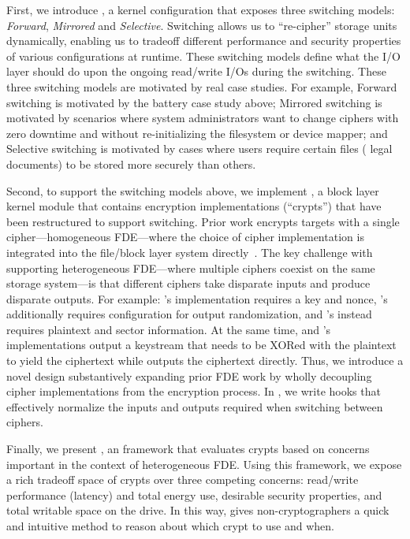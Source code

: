 First, we introduce \sysA, a kernel configuration that exposes three switching
models: {\em Forward}, {\em Mirrored} and {\em Selective}. Switching allows us
to ``re-cipher'' storage units dynamically, enabling us to tradeoff different
performance and security properties of various configurations at runtime. These
switching models define what the I/O layer should do upon the ongoing read/write
I/Os during the switching. These three switching models are motivated by real
case studies. For example, Forward switching is motivated by the battery case
study above; Mirrored switching is motivated by scenarios where system
administrators want to change ciphers with zero downtime and without
re-initializing the filesystem or device mapper; and
Selective switching is motivated by cases where users require certain files (\eg
legal documents) to be stored more securely than others.

Second, to support the switching models above, we implement \sysB, a block layer
kernel module that contains encryption implementations (``crypts'') that have
been restructured to support switching. Prior work encrypts targets with a
single cipher---\ie homogeneous FDE---where the choice of cipher implementation
is integrated into the file/block layer system directly~\cite{StrongBox,
dmcrypt}. The key challenge with supporting heterogeneous FDE---where multiple
ciphers coexist on the same storage system---is that different ciphers take
disparate inputs and produce disparate outputs. For example: \encB's
implementation requires a key and nonce, \encA's additionally requires
configuration for output randomization, and \encC's instead requires plaintext
and sector information. At the same time, \encA and \encB's implementations
output a keystream that needs to be XORed with the plaintext to yield the
ciphertext while \encC outputs the ciphertext directly. Thus, we introduce a
novel design substantively expanding prior FDE work by wholly decoupling cipher
implementations from the encryption process. In \sysB, we write hooks that
effectively normalize the inputs and outputs required when switching between
ciphers.

Finally, we present \sysC, an framework that evaluates crypts based on concerns
important in the context of heterogeneous FDE. Using this framework, we expose a
rich tradeoff space of crypts over three competing concerns: read/write
performance (latency) and total energy use, desirable security properties, and
total writable space on the drive. In this way, \sysC gives non-cryptographers a
quick and intuitive method to reason about which crypt to use and when.

